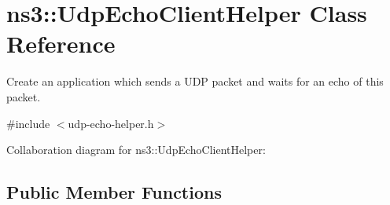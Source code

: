 \hypertarget{classns3_1_1UdpEchoClientHelper}{}\section{ns3\+:\+:Udp\+Echo\+Client\+Helper Class Reference}
\label{classns3_1_1UdpEchoClientHelper}


Create an application which sends a U\+DP packet and waits for an echo of this packet.  




{\ttfamily \#include $<$udp-\/echo-\/helper.\+h$>$}



Collaboration diagram for ns3\+:\+:Udp\+Echo\+Client\+Helper\+:
\subsection*{Public Member Functions}
